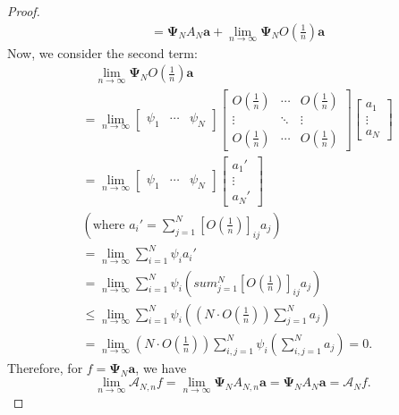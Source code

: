 \documentclass{article}[11]
\begin{document}
\begin{proof}
\begin{align*}
		&= \mathbf{\Psi}_N A_N \mathbf{a} + \lim_{n\to\infty} \mathbf{\Psi}_N O(\tfrac{1}{n})\mathbf{a}
	\end{align*}
	Now, we consider the second term:
	\begin{align*}
		&\quad \lim_{n\to\infty} \mathbf{\Psi}_N O(\tfrac{1}{n})\mathbf{a} \\
		&= \lim_{n\to\infty} 
		\begin{bmatrix}
			\psi_1 & \cdots & \psi_N
		\end{bmatrix}
		\begin{bmatrix}
			O(\tfrac{1}{n}) & \cdots & O(\tfrac{1}{n}) \\
			\vdots & \ddots & \vdots \\
			O(\tfrac{1}{n}) & \cdots & O(\tfrac{1}{n})
		\end{bmatrix}
		\begin{bmatrix}
			a_1 \\
			\vdots \\
			a_N
		\end{bmatrix} \\
		&= \lim_{n\to\infty} 
		\begin{bmatrix}
			\psi_1 & \cdots & \psi_N
		\end{bmatrix}
		\begin{bmatrix}
			a_1' \\
			\vdots \\
			a_N'
		\end{bmatrix} \\
		&(\text{where $a_i'=\sum_{j=1}^N [O(\tfrac{1}{n})]_{ij}a_j$}) \\
		&= \lim_{n\to\infty} \sum_{i=1}^N \psi_i a_i' \\
		&= \lim_{n\to\infty} \sum_{i=1}^N \psi_i \left( sum_{j=1}^N [O(\tfrac{1}{n})]_{ij}a_j \right) \\
		&\leq \lim_{n\to\infty} \sum_{i=1}^N \psi_i \left( \left(N \cdot O(\tfrac{1}{n})\right) \sum_{j=1}^N a_j \right) \\
		&= \lim_{n\to\infty} \left(N \cdot O(\tfrac{1}{n})\right) \sum_{i,j=1}^N \psi_i \left( \sum_{i,j=1}^N a_j \right) = 0.
	\end{align*}
	Therefore, for $f=\mathbf{\Psi}_N\mathbf{a}$, we have
	$$
	\lim_{n\to\infty} \mathcal{A}_{N,n}f = \lim_{n\to\infty} \mathbf{\Psi}_N A_{N,n} \mathbf{a} = \mathbf{\Psi}_N A_N \mathbf{a} = \mathcal{A}_N f.
	$$
\end{proof}


\newpage
\end{document}
